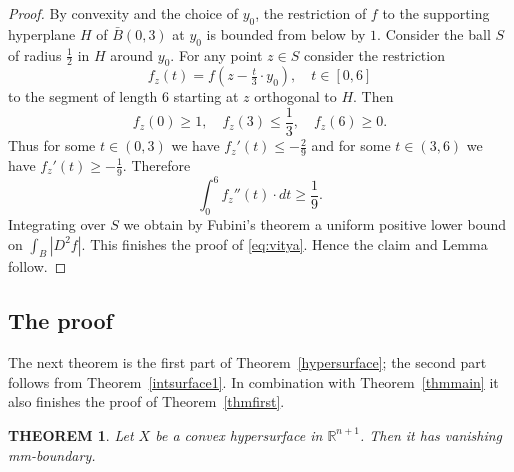 \documentclass[12pt,leqno,intlimits]{amsart}
\numberwithin{equation}{section}
\newtheorem{thm}{THEOREM}[section]
\theoremstyle{definition}
\theoremstyle{remark}
\newcommand{\tref}[1]{Theorem~\ref{#1}}
\newcommand{\R}{\mathbb{R}}
\begin{document}
\begin{proof}
By convexity and the choice of $y_0$, the restriction of $f$ to the supporting hyperplane $H$ of $\bar B(0,3)$ at $y_0$ is bounded from below by $1$. Consider the ball $S$ of radius $\frac 1 2$ in $H$ around $y_0$. For any point $z\in S$ consider the restriction
$$f_z (t)= f(z- \tfrac t 3\cdot y_0 ),\quad t\in [0,6]$$
to the segment of length $6$ starting at $z$ orthogonal to $H$.
Then
$$f_z(0)\geq 1,\quad
f_z (3)\leq \frac 1 3,\quad
f_z (6) \geq 0.$$
Thus for some $t\in (0,3)$ we have $f_z'(t) \leq -\frac 2 9$ and for some $t\in (3,6)$ we have $f_z'(t) \geq - \frac 1 9$.
Therefore
$$\int _0 ^6 f_z'' (t)\cdot dt \geq \frac 1 9.$$
Integrating over $S$ we obtain by Fubini's theorem a uniform positive lower bound on $\int _{B} |D^2f|$.
This finishes the proof of \eqref{eq:vitya}.
Hence the claim and Lemma follow.
\end{proof}

\subsection{The proof} The next theorem is the first part of \tref{hypersurface};
the second part follows from \tref{intsurface1}.
In combination with \tref{thmmain} it also finishes the proof of \tref{thmfirst}. %

\begin{thm} \label{thmconv}
Let $X$ be a convex hypersurface in $\R^{n+1}$.
Then it has vanishing  mm-boundary.

\end{thm}
\end{document}
